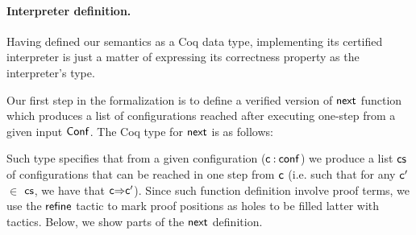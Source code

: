 \documentclass[sigplan]{acmart}
\def\resethooks{%
  \global\let\SaveRestoreHook\empty
  \global\let\ColumnHook\empty}
\let\hspre\empty
\let\hspost\empty
\theoremstyle{definition}
\newcommand{\D}[1]{\blue{\mathsf{#1}}}
\newcommand{\F}[1]{\green{\mathsf{#1}}}
\newcommand{\V}[1]{\black{\mathsf{#1}}}
\begin{document}
\paragraph{Interpreter definition.} Having defined our semantics as a Coq data type,
implementing its certified interpreter is just a matter of expressing its correctness property
as the interpreter's type.

Our first step in the formalization is to define a verified version of \ensuremath{\F{next}} function which produces
a list of configurations reached after executing one-step from a given input \ensuremath{\D{Conf}}. The Coq type for
\ensuremath{\F{next}} is as follows:

\resethooks

Such type specifies that from a given configuration (\ensuremath{\V{c}\mathbin{:}\D{conf}}) we produce a list \ensuremath{\V{cs}} of configurations that
can be reached in one step from \ensuremath{\V{c}} (i.e. such that for any \ensuremath{\V{c'}}$\in$ \ensuremath{\V{cs}}, we have that \ensuremath{\V{c}\D{\Rightarrow}\V{c'}}). Since
such function definition involve proof terms, we use the \ensuremath{\V{refine}} tactic to mark proof positions as holes to
be filled latter with tactics. Below, we show parts of the \ensuremath{\F{next}} definition.
\end{document}

